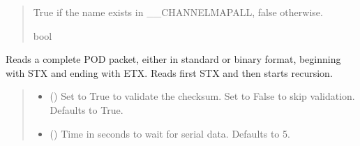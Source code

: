 \documentclass[letterpaper,10pt,english]{sphinxmanual}
\begin{document}
\begin{fulllineitems}
\begin{fulllineitems}
\begin{quote}
\begin{description}
\sphinxAtStartPar
True if the name exists in \_\_CHANNELMAPALL, false otherwise.

\sphinxAtStartPar
bool

\end{description}\end{quote}

\end{fulllineitems}


\begin{fulllineitems}
\label{\detokenize{PodApi.Devices:PodApi.Devices.PodDevice_8401HR.Pod8401HR.ReadPODpacket}}
\pysigstartsignatures
{}
\pysigstopsignatures
\sphinxAtStartPar
Reads a complete POD packet, either in standard or binary format, beginning with STX and         ending with ETX. Reads first STX and then starts recursion.
\begin{quote}\begin{description}
\begin{itemize}
\item {} 
\sphinxAtStartPar
{} (\sphinxstyleliteralemphasis{\sphinxupquote{, }}) \textendash{} Set to True to validate the checksum. Set to False to                 skip validation. Defaults to True.

\item {} 
\sphinxAtStartPar
{} (\sphinxstyleliteralemphasis{\sphinxupquote{|}}\sphinxstyleliteralemphasis{\sphinxupquote{, }}) \textendash{} Time in seconds to wait for serial data.                 Defaults to 5.


\end{itemize}
\end{description}
\end{quote}
\end{fulllineitems}
\end{fulllineitems}
\end{document}
